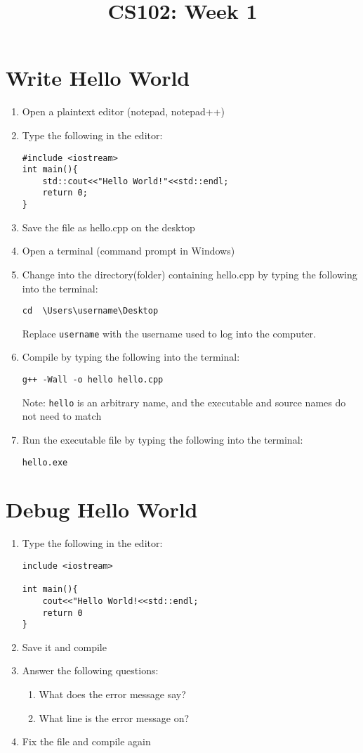 \documentclass{article}
\begin{document}
\title{CS102: Week 1}

\maketitle

\section*{Write Hello World}
\begin{enumerate}
\item Open a plaintext editor (notepad, notepad++)
\item Type the following in the editor:
\begin{verbatim}
#include <iostream>
int main(){
	std::cout<<"Hello World!"<<std::endl;
	return 0;
}
\end{verbatim}
\item Save the file as hello.cpp on the desktop
\item Open a terminal (command prompt in Windows)
\item Change into the directory(folder) containing hello.cpp by typing the following into the terminal: 
\begin{verbatim}
cd  \Users\username\Desktop
\end{verbatim}
Replace \texttt{username} with the username used to log into the computer.

\item Compile by typing the following into the terminal:
\begin{verbatim}
g++ -Wall -o hello hello.cpp
\end{verbatim}
Note: \texttt{hello} is an arbitrary name, and the executable and source names do not need to match

\item Run the executable file by typing the following into the terminal:
\begin{verbatim}
hello.exe
\end{verbatim}

\end{enumerate}
\pagebreak
\section*{Debug Hello World}
\begin{enumerate}
\item Type the following in the editor:
\begin{verbatim}
include <iostream>
	
int main(){
	cout<<"Hello World!<<std::endl;
	return 0
}
\end{verbatim}
\item Save it and compile
\\
\item Answer the following questions:
	\begin{enumerate}
		\item What does the error message say?
		\item What line is the error message on?
	\end{enumerate}
\item Fix the file and compile again
\end{enumerate}
\end{document}
